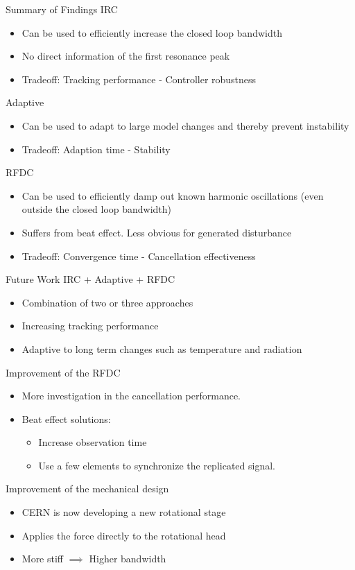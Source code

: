 \documentclass[10pt]{beamer}
\begin{document}
\begin{frame}{Summary of Findings}
  IRC
  \begin{itemize}
    \item  Can be used to efficiently increase the closed loop bandwidth
    \item  No direct information of the first resonance peak
    \item  Tradeoff: Tracking performance - Controller robustness
  \end{itemize}
  Adaptive
  \begin{itemize}
    \item Can be used to adapt to large model changes and thereby prevent instability
    \item Tradeoff: Adaption time - Stability
  \end{itemize}
  RFDC
  \begin{itemize}
    \item Can be used to efficiently damp out known harmonic oscillations (even outside the closed loop bandwidth)
    \item Suffers from beat effect. Less obvious for generated disturbance
    \item Tradeoff: Convergence time - Cancellation effectiveness
  \end{itemize}
\end{frame}

\begin{frame}{Future Work}
  IRC + Adaptive + RFDC
  \begin{itemize}
    \item Combination of two or three approaches
    \item Increasing tracking performance
    \item Adaptive to long term changes such as temperature and radiation
  \end{itemize}
  Improvement of the RFDC
  \begin{itemize}
    \item More investigation in the cancellation performance.
    \item Beat effect solutions:
    \begin{itemize}
      \item Increase observation time
      \item Use a few elements to synchronize the replicated signal.
    \end{itemize}
  \end{itemize}
  Improvement of the mechanical design
  \begin{itemize}
    \item CERN is now developing a new rotational stage
    \item Applies the force directly to the rotational head
    \item More stiff $\implies$ Higher bandwidth
  \end{itemize}
\end{frame}
\end{document}
